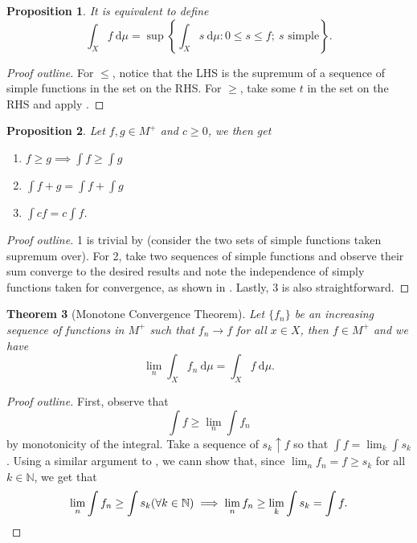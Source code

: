 \documentclass[letterpaper,12pt]{article}
\theoremstyle{definition}
\theoremstyle{plain}
\newtheorem{thm}{Theorem}[section]
\newtheorem{proposition}[thm]{Proposition}
\theoremstyle{remark}
\newcommand{\N}{\mathbb{N}}
\begin{document}
\begin{proposition}\label{prop:AltMPlusInt}
It is equivalent to define
\[\int_X f\ \mathrm{d}\mu = \sup\left\{\int_X s\ \mathrm{d}\mu:0\leq s\leq f;\ s\text{ simple}\right\}.\]
\end{proposition}

\begin{proof}[Proof outline]
For $\leq$, notice that the LHS is the supremum of a sequence of simple functions in the set on the RHS. For $\geq$, take some $t$ in the set on the RHS and apply .
\end{proof}

\begin{proposition}
Let $f,g\in M^+$ and $c\geq 0$, we then get
\begin{enumerate}
  \item $f\geq g \implies \int f\geq \int g$
  \item $\int f+g = \int f+ \int g$
  \item $\int cf = c\int f$.
\end{enumerate}
\end{proposition}

\begin{proof}[Proof outline]
1 is trivial by  (consider the two sets of simple functions taken supremum over). For 2, take two sequences of simple functions and observe their sum converge to the desired results and note the independence of simply functions taken for convergence, as shown in . Lastly, 3 is also straightforward.
\end{proof}

\begin{thm}[Monotone Convergence Theorem]
Let $\{f_n\}$ be an \emph{increasing} sequence of functions in $M^+$ such that $f_n\to f$ for all $x\in X$, then $f\in M^+$ and we have
\[\lim_n \int_X f_n\ \mathrm{d}\mu = \int_X f\ \mathrm{d}\mu.\]
\end{thm}

\begin{proof}[Proof outline]
First, observe that
\[\int f\geq \lim_n\int f_n\]
by monotonicity of the integral. Take a sequence of $s_k\uparrow f$ so that $\int f = \lim_k \int s_k$. Using a similar argument to , we cann show that, since $\lim_n f_n = f \geq s_k$ for all $k\in\N$, we get that
\[\lim_n\int f_n\geq \int s_k (\forall k\in\N) \implies \lim_n f_n \geq \lim_k\int s_k = \int f.\qedhere\]
\end{proof}
\end{document}
